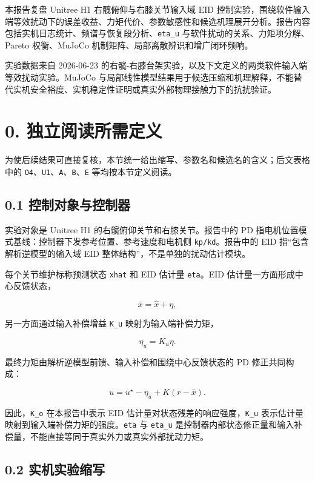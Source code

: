 本报告复盘 Unitree H1 右髋俯仰与右膝关节输入域 EID 控制实验，围绕软件输入端等效扰动下的误差收益、力矩代价、参数敏感性和候选机理展开分析。报告内容包括实机日志统计、频谱与恢复段分析、\texttt{eta\_u} 与软件扰动的关系、力矩项分解、Pareto 权衡、MuJoCo 机制矩阵、局部离散辨识和增广闭环频响。

实验数据来自 2026-06-23 的右髋-右膝台架实验，以及下文定义的两类软件输入端等效扰动实验。MuJoCo 与局部线性模型结果用于候选压缩和机理解释，不能替代实机安全裕度、实机稳定性证明或真实外部物理接触力下的抗扰验证。

\section{0. 独立阅读所需定义}\label{ux72ecux7acbux9605ux8bfbux6240ux9700ux5b9aux4e49}

为使后续结果可直接复核，本节统一给出缩写、参数名和候选名的含义；后文表格中的 \texttt{O4}、\texttt{U1}、\texttt{A}、\texttt{B}、\texttt{E} 等均按本节定义阅读。

\subsection{0.1 控制对象与控制器}\label{ux63a7ux5236ux5bf9ux8c61ux4e0eux63a7ux5236ux5668}

实验对象是 Unitree H1 的右髋俯仰关节和右膝关节。报告中的 PD 指电机位置模式基线：控制器下发参考位置、参考速度和电机侧 \texttt{kp/kd}。报告中的 EID 指``包含解析逆模型的输入域 EID 整体结构''，不是单独的扰动估计模块。

每个关节维护标称预测状态 \texttt{xhat} 和 EID 估计量 \texttt{eta}。EID 估计量一方面形成中心反馈状态，

\[
\bar{x}=\hat{x}+\eta,
\]

另一方面通过输入补偿增益 \texttt{K\_u} 映射为输入端补偿力矩，

\[
\eta_u=K_u\eta.
\]

最终力矩由解析逆模型前馈、输入补偿和围绕中心反馈状态的 PD 修正共同构成：

\[
u=u^\star-\eta_u+K(r-\bar{x}).
\]

因此，\texttt{K\_o} 在本报告中表示 EID 估计量对状态残差的响应强度，\texttt{K\_u} 表示估计量映射到输入端补偿力矩的强度。\texttt{eta} 与 \texttt{eta\_u} 是控制器内部状态修正量和输入补偿量，不能直接等同于真实外力或真实外部扰动力矩。

\subsection{0.2 实机实验缩写}\label{ux5b9eux673aux5b9eux9a8cux7f29ux5199}


